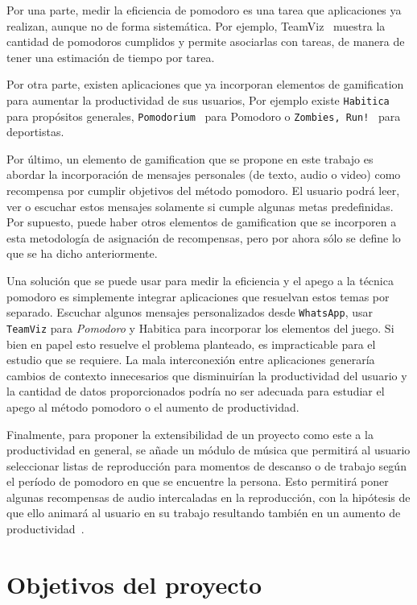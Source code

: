 \documentclass[12pt,letterpaper]{report}
\begin{document}
Por una parte, medir la eficiencia de pomodoro es una tarea que
aplicaciones ya realizan, aunque no de forma sistemática. Por ejemplo,
TeamViz~\cite{teamviz} muestra la cantidad de pomodoros cumplidos y
permite asociarlas con tareas, de manera de tener una estimación de
tiempo por tarea.

Por otra parte, existen aplicaciones que ya incorporan elementos de
gamification para aumentar la productividad de sus usuarios, Por
ejemplo existe \texttt{Habitica}~\cite{habitica} para propósitos
generales, \texttt{Pomodorium}~\cite{pomodorium} para Pomodoro o
\texttt{Zombies, Run!}~\cite{zombiesrun} para deportistas.

Por último, un elemento de gamification que se propone en este trabajo
es abordar la incorporación de mensajes personales (de texto, audio o
video) como recompensa por cumplir objetivos del método pomodoro. El
usuario podrá leer, ver o escuchar estos mensajes solamente si cumple
algunas metas predefinidas. Por supuesto, puede haber otros elementos
de gamification que se incorporen a esta metodología de asignación de
recompensas, pero por ahora sólo se define lo que se ha dicho
anteriormente.

Una solución que se puede usar para medir la eficiencia y el apego a
la técnica pomodoro es simplemente integrar aplicaciones que resuelvan
estos temas por separado. Escuchar algunos mensajes personalizados
desde \texttt{WhatsApp}, usar \texttt{TeamViz} para \emph{Pomodoro} y
Habitica para incorporar los elementos del juego. Si bien en papel
esto resuelve el problema planteado, es impracticable para el estudio
que se requiere. La mala interconexión entre aplicaciones generaría
cambios de contexto innecesarios que disminuirían la productividad del
usuario y la cantidad de datos proporcionados podría no ser adecuada
para estudiar el apego al método pomodoro o el aumento de
productividad.

Finalmente, para proponer la extensibilidad de un proyecto como este a
la productividad en general, se añade un módulo de música que
permitirá al usuario seleccionar listas de reproducción para momentos
de descanso o de trabajo según el período de pomodoro en que se
encuentre la persona. Esto permitirá poner algunas recompensas de
audio intercaladas en la reproducción, con la hipótesis de que ello
animará al usuario en su trabajo resultando también en un aumento de
productividad~\cite{hallam2002effects}.

\newpage
\section{Objetivos del proyecto}\label{objetivos-del-proyecto}
\end{document}
